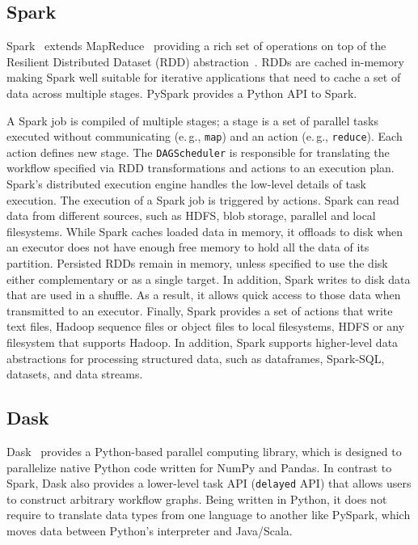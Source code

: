 \subsection{Spark}
Spark~\cite{zaharia2010spark} extends MapReduce~\cite{dean2004mapreduce} providing a rich set of operations on top of the Resilient Distributed Dataset (RDD) abstraction~\cite{zaharia2012resilient}.
RDDs are cached in-memory making Spark well suitable for iterative applications that need to cache a set of data across multiple stages.
PySpark provides a Python API to Spark.

A Spark job is compiled of multiple stages; a stage is a set of parallel tasks executed without communicating (e.\,g., \texttt{map}) and an action (e.\,g., \texttt{reduce}).
Each action defines new stage.
The \texttt{DAGScheduler} is responsible for translating the workflow specified via RDD transformations and actions to an execution plan.
Spark's distributed execution engine handles the low-level details of task execution.
The execution of a Spark job is triggered by actions.
Spark can read data from different sources, such as HDFS, blob storage, parallel and local filesystems.
While Spark caches loaded data in memory, it offloads to disk when an executor does not have enough free memory to hold all the data of its partition.
Persisted RDDs remain in memory, unless specified to use the disk either complementary or as a single target.
In addition, Spark writes to disk data that are used in a shuffle.
As a result, it allows quick access to those data when transmitted to an executor.
Finally, Spark provides a set of actions that write text files, Hadoop sequence files or object files to local filesystems, HDFS or any filesystem that supports Hadoop.
In addition, Spark supports higher-level data abstractions for processing structured data, such as dataframes, Spark-SQL, datasets, and data streams.

\subsection{Dask}
Dask~\cite{rocklin2015dask} provides a Python-based parallel computing library, which is designed to parallelize native Python code written for NumPy and Pandas.
In contrast to Spark, Dask also provides a lower-level task API (\texttt{delayed} API) that allows users to construct arbitrary workflow graphs.
Being written in Python, it does not require to translate data 
types from one language to another like PySpark, which moves data between Python's interpreter and Java/Scala.

